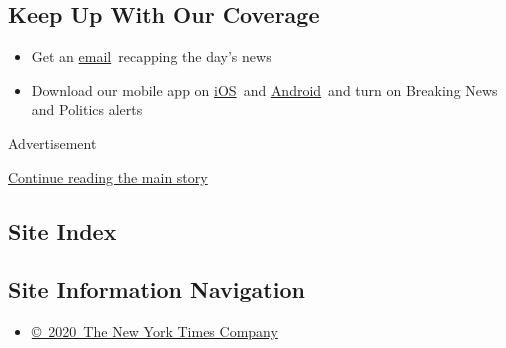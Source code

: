 \begin{itemize}
{  \subsection{Keep Up With Our
  Coverage}\label{keep-up-with-our-coverage}}

  \begin{itemize}
  \item
    Get an
    \href{https://www.nytimes3xbfgragh.onion/newsletters/politics?action=click\&pgtype=Article\&state=default\&region=BELOW_MAIN_CONTENT\&context=storylines_guide}{email}~recapping
    the day's news
  \item
    Download our mobile app on
    \href{https://apps.apple.com/us/app/nytimes/id284862083?ls=1\&mat_click_id=5c79ae7455014fd1bd66b5610c05b8f2-20191112-16948\&referrer=mat_click_id\%3D5c79ae7455014fd1bd66b5610c05b8f2-20191112-16948\%26link_click_id\%3D722930677036718082}{iOS}~and
    \href{http://a.localytics.com/android?id=com.nytimes.android\&referrer=utm_source\%3Dother_nyt_mobile_web\%26utm_medium\%3DWeb\%2520page\%26utm_term\%3DGeneral\%2520Mobile\%2520Page\%26utm_campaign\%3DNYT\%2520Mobile\%2520General\%2520Page}{Android}~and
    turn on Breaking News and Politics alerts
  \end{itemize}
\end{itemize}

Advertisement

\protect\hyperlink{after-bottom}{Continue reading the main story}

\hypertarget{site-index}{%
\subsection{Site Index}\label{site-index}}

\hypertarget{site-information-navigation}{%
\subsection{Site Information
Navigation}\label{site-information-navigation}}

\begin{itemize}
\tightlist
\item
  \href{https://help.nytimes3xbfgragh.onion/hc/en-us/articles/115014792127-Copyright-notice}{©~2020~The
  New York Times Company}
\end{itemize}

